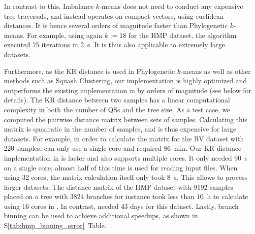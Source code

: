 In contrast to this, Imbalance $k$-means does not need to conduct any expensive tree traversals,
and instead operates on compact vectors, using euclidean distances.
It is hence several orders of magnitude faster than Phylogenetic $k$-means.
For example, using again $k:=18$ for the \ac{HMP} dataset,
the algorithm executed \num{75} iterations in \SI{2}{\second}.
It is thus also applicable to extremely large datasets.

Furthermore, as the KR distance is used in Phylogenetic $k$-means as well as other methods such as Squash Clustering,
our implementation is highly optimized and
outperforms the existing implementation in  \cite{Matsen2010} by orders of magnitude (see below for details).
The KR distance between two samples has a linear computational complexity in both the number of \acp{QS} and the tree size.
As a test case, we computed the pairwise distance matrix between sets of samples.
Calculating this matrix is quadratic in the number of samples,
and is thus expensive for large datasets.
For example, in order to calculate the matrix for the \ac{BV} dataset with \num{220} samples,
 can only use a single core and required \SI{86}{\minute}.
Our KR distance implementation in  is faster and also supports multiple cores.
It only needed \SI{90}{\second} on a single core; almost half of this time is used for reading input files.
When using \num{32} cores, the matrix calculation itself only took \SI{8}{\second}.
This allows to process larger datasets:
The distance matrix of the \ac{HMP} dataset with \num{9 192} samples placed on a tree with \num{3 824} branches
for instance took less than \SI{10}{\hour} to calculate using \num{16} cores in .
In contrast,  needed \num{43} days for this dataset.
Lastly, branch binning can be used to achieve additional speedups,
as shown in S\ref{tab:hmp_binning_error}~Table.


